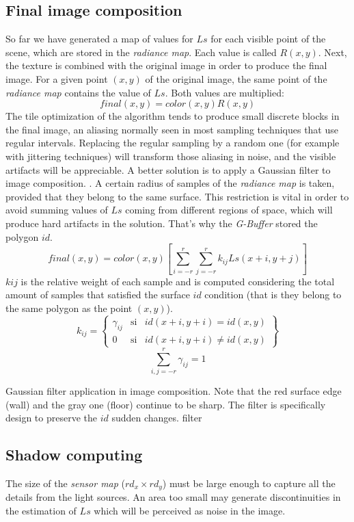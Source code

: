 \documentclass[10pt, conference]{IEEEtran}
\begin{document}
\subsection{Final image composition}
So far we have generated a map of values for $Ls$ for each visible point of the scene, which are stored in the \emph{radiance map}. 
Each value is called $R(x, y)$. Next, the texture is combined with the original image in order to produce the final image. 
For a given point $(x,y)$ of the original image, the same point of the \emph{radiance map} contains the value of $Ls$. Both values are multiplied:
\[
	final(x,y) = color(x,y)R(x, y)
\]
The tile optimization of the algorithm tends to produce small discrete blocks in the final image, an aliasing normally seen in most sampling techniques that use regular intervals. 
Replacing the regular sampling by a random one (for example with jittering techniques) will transform those aliasing in noise, and the visible artifacts will be appreciable. 
A better solution is to apply a Gaussian filter \cite{gauss_filter} to image composition. . 
A certain radius of samples of the \emph{radiance map} is taken, provided that they belong to the same surface. 
This restriction is vital in order to avoid summing values of $Ls$ coming from different regions of space, which will produce hard artifacts in the solution. 
That’s why the \emph{G-Buffer} stored the polygon $id$.
\[
	final(x,y) = color(x,y)[ \sum_{i=-r}^r{ \sum_{j=-r}^r{k_{ij}Ls(x+i,y+j)}}]
\]
$kij$ is the relative weight of each sample and is computed considering the total amount of samples that satisfied the surface $id$ condition (that is they belong to the same polygon as the point $(x, y)$).
\[
	k_{ij}=
		\begin{Bmatrix}
			\gamma_{ij} & \mbox{si}& id(x+i,y+i) = id(x,y)\\
			0 & \mbox{si} & id(x+i,y+i) \neq id(x,y)
		\end{Bmatrix}
\]
\[
	\sum_{i,j=-r}^r \gamma_{ij} = 1
\]

\subimages
	{Gaussian filter application in image composition. Note that the red surface edge (wall) and the gray one (floor) continue to be sharp. 
	The filter is specifically design to preserve the $id$ sudden changes.}
	{filter}{
}

\subsection{Shadow computing}
The size of the \emph{sensor map} ($rd_x \times rd_y$) must be large enough to capture all the details from the light sources. 
An area too small may generate discontinuities in the estimation of $Ls$ which will be perceived as noise in the image.\\
\end{document}
